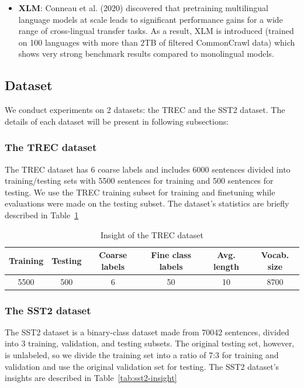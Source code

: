 \documentclass[sn-mathphys,Numbered]{sn-jnl}%
\theoremstyle{thmstyleone}%
\theoremstyle{thmstyletwo}%
\theoremstyle{thmstylethree}%
\begin{document}
\begin{itemize}
\item \textbf{XLM}: Conneau et al. (2020)\cite{Conneau2020} discovered that pretraining multilingual language models at scale leads to significant performance gains for a wide range of cross-lingual transfer tasks. As a result, XLM is introduced (trained on 100 languages with more than 2TB of filtered CommonCrawl data) which shows very strong benchmark results compared to monolingual models.
\end{itemize}

\subsection{Dataset}
We conduct experiments on 2 datasets: the TREC and the SST2 dataset. The details of each dataset will be present in following subsections:

\subsubsection{The TREC dataset}
The TREC dataset\cite{hovy2001, li2002} has 6 coarse labels and includes 6000 sentences divided into training/testing sets with 5500 sentences for training and 500 sentences for testing. We use the TREC training subset for training and finetuning while evaluations were made on the testing subset. The dataset’s statistics are briefly described in Table~\ref{tab:trec-insight}

\begin{table}[htp]
\centering
\caption{Insight of the TREC dataset} \label{tab:trec-insight}
\begin{tabular*}{\textwidth}{@{\extracolsep\fill}cccccc}
\toprule
\textbf{Training} & \textbf{Testing} & \textbf{Coarse labels} & \textbf{Fine class labels} & \textbf{Avg. length} & \textbf{Vocab. size} \\ \midrule
5500              & 500              & 6                      & 50                         & 10                   & 8700                 \\ \bottomrule
\end{tabular*}
\end{table}

\subsubsection{The SST2 dataset}
The SST2 dataset\cite{Socher2013} is a binary-class dataset made from 70042 sentences, divided into 3 training, validation, and testing subsets. The original testing set, however, is unlabeled, so we divide the training set into a ratio of 7:3 for training and validation and use the original validation set for testing. The SST2 dataset’s insights are described in Table~\ref{tab:sst2-insight}
\end{document}
